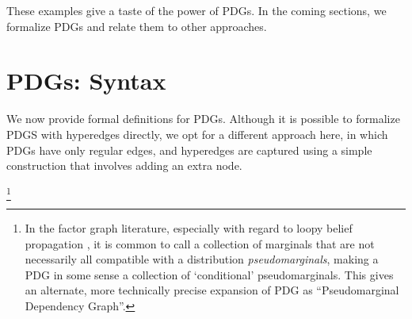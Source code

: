 \documentclass{article}
\theoremstyle{plain}
\theoremstyle{definition}
\theoremstyle{remark}
\newcommand{\vfullfootnote}[1]{}
\renewcommand{\vfullfootnote}[1]{\footnote{#1}}
\numberwithin{equation}{section}
\begin{document}
These examples give a taste of the power of PDGs.  In the coming sections, we formalize PDGs and relate them to other approaches.		
	
	
\section{PDGs: Syntax}\label{sec:formal+syntax}
We now provide formal definitions for PDGs.        
Although it is possible to formalize PDGS with hyperedges directly,
    we opt for a different approach here, in which PDGs have only regular edges,
and hyperedges are captured using a simple construction
that involves adding an extra node.

\vfullfootnote{In the factor graph literature,
          especially with regard to loopy belief propagation
          \cite{wainwright2007graphical}, it is common to
          call a collection of marginals that are not
          necessarily all compatible with a distribution
          \emph{pseudomarginals}, making a PDG in some sense a
          collection of `conditional' pseudomarginals. This
          gives an alternate, more technically precise
          expansion of PDG as ``Pseudomarginal Dependency Graph''.} 
\end{document}
